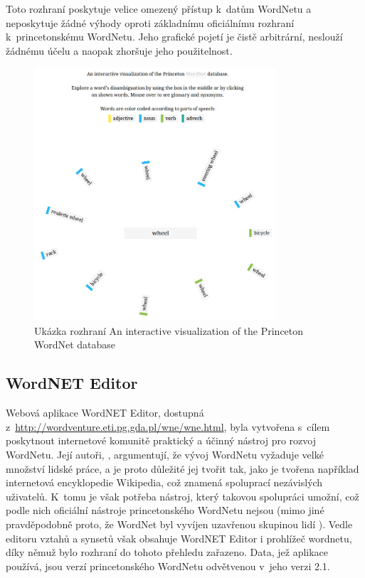 \documentclass[a4paper, 11pt, oneside, showtrims]{book}
\begin{document}
					Toto rozhraní poskytuje velice omezený přístup k~datům WordNetu a neposkytuje žádné výhody oproti základnímu oficiálnímu rozhraní k~princetonskému WordNetu. Jeho grafické pojetí je čistě arbitrární, neslouží žádnému účelu a naopak zhoršuje jeho použitelnost.

					\begin{figure}[h]
						\centering
						\includegraphics[width=0.8\textwidth]{intviswn.png}
						\caption{Ukázka rozhraní An interactive visualization of the Princeton WordNet database}
						\label{fig:intviswn}
					\end{figure}

				\subsection{WordNET Editor}
				\label{wnvis:wncoledit}

					Webová aplikace WordNET Editor, dostupná z~\url{http://wordventure.eti.pg.gda.pl/wne/wne.html}, byla vytvořena s~cílem poskytnout internetové komunitě praktický a účinný nástroj pro rozvoj WordNetu. Její autoři, \textcite{szymanski2007cooperative}, argumentují, že vývoj WordNetu vyžaduje velké množství lidské práce, a je proto důležité jej tvořit tak, jako je tvořena například internetová encyklopedie Wikipedia, což znamená spoluprací nezávislých uživatelů. K~tomu je však potřeba nástroj, který takovou spolupráci umožní, což podle nich oficiální nástroje princetonského WordNetu nejsou (mimo jiné pravděpodobně proto, že WordNet byl vyvíjen uzavřenou skupinou lidí \parencite{fellbaum2005wordnets}). Vedle editoru vztahů a synsetů však obsahuje WordNET Editor i prohlížeč wordnetu, díky němuž bylo rozhraní do tohoto přehledu zařazeno. Data, jež aplikace používá, jsou verzí princetonského WordNetu odvětvenou v~jeho verzi 2.1. \parencite{szymanski2007cooperative}
\end{document}
